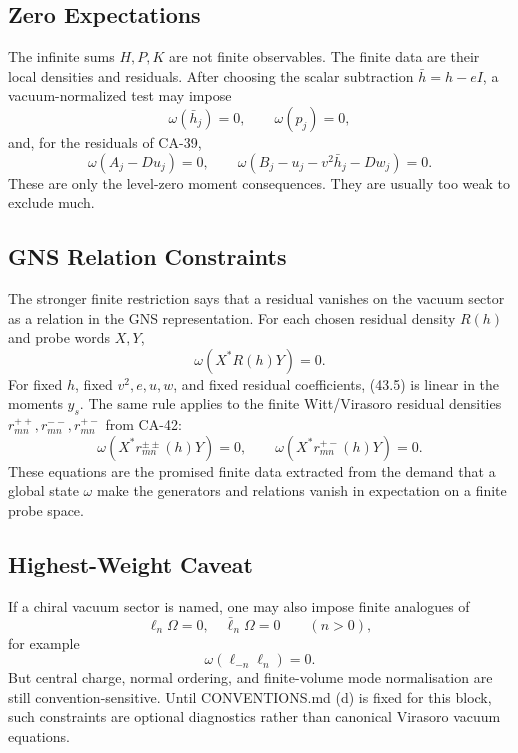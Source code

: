\subsection{Zero Expectations}

The infinite sums \(H,P,K\) are not finite observables.  The finite data are
their local densities and residuals.  After choosing the scalar subtraction
\(\bar h=h-eI\), a vacuum-normalized test may impose
\[
  \omega(\bar h_j)=0,\qquad
  \omega(p_j)=0,
  \tag{43.3}
\]
and, for the residuals of CA-39,
\[
  \omega(A_j-Du_j)=0,\qquad
  \omega(B_j-u_j-v^2\bar h_j-Dw_j)=0.
  \tag{43.4}
\]
These are only the level-zero moment consequences.  They are usually too weak
to exclude much.

\subsection{GNS Relation Constraints}

The stronger finite restriction says that a residual vanishes on the vacuum
sector as a relation in the GNS representation.  For each chosen residual
density \(R(h)\) and probe words \(X,Y\),
\[
  \omega(X^*R(h)Y)=0.
  \tag{43.5}
\]
For fixed \(h\), fixed \(v^2,e,u,w\), and fixed residual coefficients, (43.5)
is linear in the moments \(y_s\).  The same rule applies to the finite
Witt/Virasoro residual densities \(r^{++}_{mn},r^{--}_{mn},r^{+-}_{mn}\) from
CA-42:
\[
  \omega(X^*r^{\pm\pm}_{mn}(h)Y)=0,
  \qquad
  \omega(X^*r^{+-}_{mn}(h)Y)=0.
  \tag{43.6}
\]
These equations are the promised finite data extracted from the demand that a
global state \(\omega\) make the generators and relations vanish in expectation
on a finite probe space.

\subsection{Highest-Weight Caveat}

If a chiral vacuum sector is named, one may also impose finite analogues of
\[
  \ell_n\Omega=0,\quad \bar\ell_n\Omega=0\qquad(n>0),
\]
for example
\[
  \omega(\ell_{-n}\ell_n)=0.
  \tag{43.7}
\]
But central charge, normal ordering, and finite-volume mode normalisation are
still convention-sensitive.  Until CONVENTIONS.md (d) is fixed for this block,
such constraints are optional diagnostics rather than canonical Virasoro
vacuum equations.

